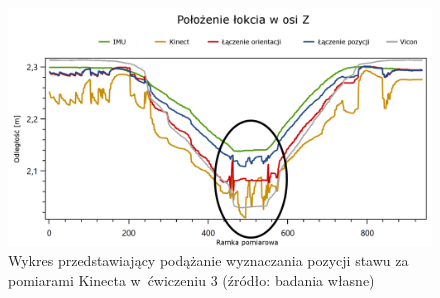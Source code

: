 	\begin{figure}[!htb]
		\centering
		\includegraphics[width=\textwidth]{images/300/Slide3_focus.png}
		\caption{Wykres przedstawiający podążanie wyznaczania pozycji stawu za pomiarami Kinecta w~ćwiczeniu 3 (źródło: badania własne)}
		\label{fig:experiments:sec:follow}
	\end{figure}
